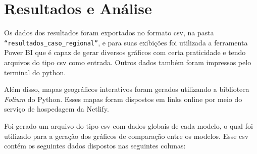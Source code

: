 \chapter{Resultados e Análise}

Os dados dos resultados foram exportados no formato csv, na pasta \texttt{``resultados\_caso\-\_regional''}, e para suas exibições foi utilizada a ferramenta Power BI que é capaz de gerar diversos gráficos com certa praticidade e tendo arquivos do tipo csv como entrada. Outros dados também foram impressos pelo terminal do python. 

Além disso, mapas geográficos interativos foram gerados utilizando a biblioteca \textit{Folium} do Python. Esses mapas foram dispostos em links online por meio do serviço de hospedagem da Netlify.

Foi gerado um arquivo do tipo csv com dados globais de cada modelo, o qual foi utilizado para a geração dos gráficos de comparação entre os modelos. Esse csv contém os seguintes dados dispostos nas seguintes colunas:

